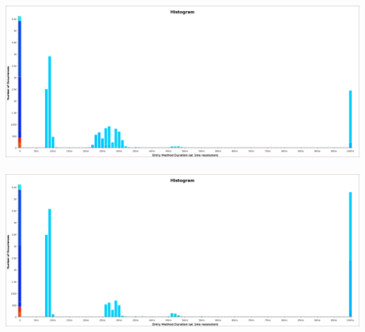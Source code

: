 \documentclass{book}
\begin{document}
\newpage
\ \\
\includegraphics[width=6.5in]{histogram-rc.png} \\ \ \\
\includegraphics[width=6.5in]{histogram-cr.png}
\end{document}
